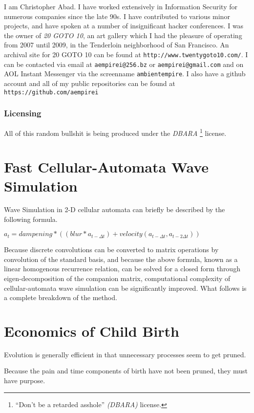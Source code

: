 \documentclass[11pt]{book}
\begin{document}
I am Christopher Abad. I have worked extensively in Information Security for numerous companies since the late 90s. I have contributed to various minor projects, and have spoken at a number of insignificant hacker conferences. I was the owner of \emph{20 GOTO 10}, an art gallery which I had the pleasure of operating from 2007 until 2009, in the Tenderloin neighborhood of San Francisco. An archival site for 20 GOTO 10 can be found at {\tt http://www.twentygoto10.com/}. I can be contacted via email at {\tt aempirei@256.bz} or {\tt aempirei@gmail.com} and on AOL Instant Messenger via the screenname {\tt ambientempire}. I also have a github account and all of my public repositories can be found at {\tt https://github.com/aempirei}

\subsection{Licensing}
\label{sec:DBARA}

All of this random bullshit is being produced under the \emph{DBARA}%
\footnote{``Don't be a retarded asshole'' \emph{(DBARA)} license.}
license.

\chapter{Fast Cellular-Automata Wave Simulation}

Wave Simulation in 2-D cellular automata can briefly be described by the following formula.

$\displaystyle a_{t} = dampening * ((blur * a_{t-{\Delta}t}) + velocity(a_{t-{\Delta}t},a_{t-2{\Delta}t})) $

Because discrete convolutions can be converted to matrix operations by convolution of the standard basis, and because the above formula, known as a linear homogenous recurrence relation, can be solved for a closed form through eigen-decomposition of the companion matrix, computational complexity of cellular-automata wave simulation can be significantly improved. What follows is a complete breakdown of the method.

\chapter{Economics of Child Birth}

Evolution is generally efficient in that unnecessary processes seem to get pruned.

Because the pain and time components of birth have not been pruned, they must have purpose.
\end{document}
